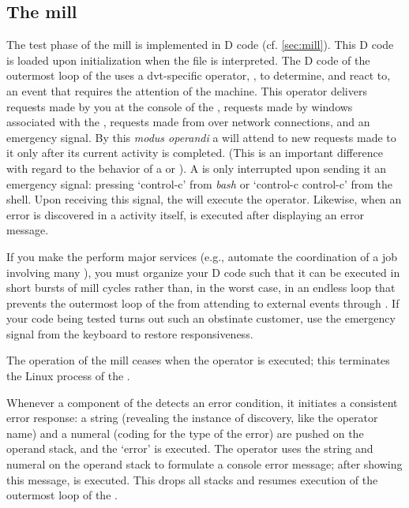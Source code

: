 \subsection{The  mill}

The test phase of the  mill is implemented in D code
(cf. \ref{sec:mill}). This D code is loaded upon initialization when
the file  is interpreted. The D code of the
outermost loop of the  uses a dvt-specific operator,
, to determine, and react to, an event that requires the
attention of the machine. This operator delivers requests made by you
at the console of the , requests made by windows associated
with the , requests made from  over
network connections, and an emergency signal. By this \emph{modus
  operandi} a  will attend to new requests made to it only
after its current activity is completed. (This is an important
difference with regard to the behavior of a  or
). A  is only interrupted upon sending it an
emergency signal: pressing `control-c' from \emph{bash} or `control-c
control-c' from the  shell. Upon receiving this signal,
the  will execute the  operator. Likewise, when
an error is discovered in a  activity itself,  is
executed after displaying an error message.

If you make the  perform major services (e.g., automate the
coordination of a job involving many ), you must
organize your D code such that it can be executed in short bursts of
mill cycles rather than, in the worst case, in an endless loop that
prevents the outermost loop of the  from attending to
external events through . If your  code being
tested turns out such an obstinate customer, use the emergency signal
from the keyboard to restore  responsiveness.

The operation of the  mill ceases when the operator
 is executed; this terminates the Linux process of the
.

Whenever a component of the  detects an error condition, it
initiates a consistent error response: a string (revealing the
instance of discovery, like the operator name) and a numeral (coding
for the type of the error) are pushed on the operand stack, and the
`error' is executed. The operator  uses the string and
numeral on the operand stack to formulate a console error message;
after showing this message,  is executed. This drops all
stacks and resumes execution of the outermost loop of the .



